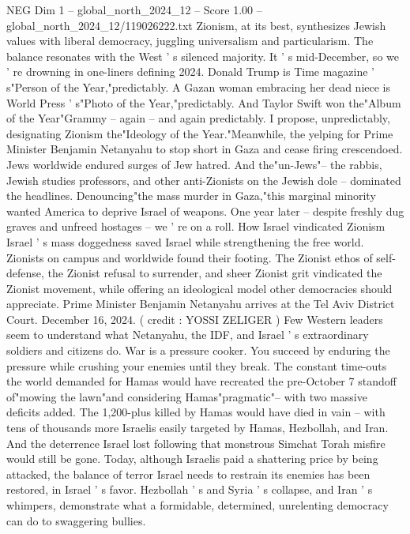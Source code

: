 \begin{textsample}{NEG Dim 1 – global\_north\_2024\_12 – Score 1.00 – global\_north\_2024\_12/119026222.txt}  \label{ex:f1_neg_228}
Zionism, at its best, synthesizes Jewish values with liberal democracy, juggling universalism and particularism.
The balance resonates with the West ' s silenced majority.
It ' s mid-December, so we ' re drowning in one-liners defining 2024.
Donald Trump is Time magazine ' s"Person of the Year,"predictably.
A Gazan woman embracing her dead niece is World Press ' s"Photo of the Year,"predictably.
And Taylor Swift won the"Album of the Year"Grammy -- again -- and again predictably.
I propose, unpredictably, designating Zionism the"Ideology of the Year."Meanwhile, the yelping for Prime Minister Benjamin Netanyahu to stop short in Gaza and cease firing crescendoed.
Jews worldwide endured surges of Jew hatred.
And the"un-Jews"-- the rabbis, Jewish studies professors, and other anti-Zionists on the Jewish dole -- dominated the headlines.
Denouncing"the mass murder in Gaza,"this marginal minority wanted America to deprive Israel of weapons.
One year later -- despite freshly dug graves and unfreed hostages -- we ' re on a roll.
How Israel vindicated Zionism Israel ' s mass doggedness saved Israel while strengthening the free world.
Zionists on campus and worldwide found their footing.
The Zionist ethos of self-defense, the Zionist refusal to surrender, and sheer Zionist grit vindicated the Zionist movement, while offering an ideological model other democracies should appreciate.
Prime Minister Benjamin Netanyahu arrives at the Tel Aviv District Court.
December 16, 2024. ( credit : YOSSI ZELIGER ) Few Western leaders seem to understand what Netanyahu, the IDF, and Israel ' s extraordinary soldiers and citizens do.
War is a pressure cooker.
You succeed by enduring the pressure while crushing your enemies until they break.
The constant time-outs the world demanded for Hamas would have recreated the pre-October 7 standoff of"mowing the lawn"and considering Hamas"pragmatic"-- with two massive deficits added.
The 1,200-plus killed by Hamas would have died in vain -- with tens of thousands more Israelis easily targeted by Hamas, Hezbollah, and Iran.
And the deterrence Israel lost following that monstrous Simchat Torah misfire would still be gone.
Today, although Israelis paid a shattering price by being attacked, the balance of terror Israel needs to restrain its enemies has been restored, in Israel ' s favor.
Hezbollah ' s and Syria ' s collapse, and Iran ' s whimpers, demonstrate what a formidable, determined, unrelenting democracy can do to swaggering bullies.

\end{textsample}
